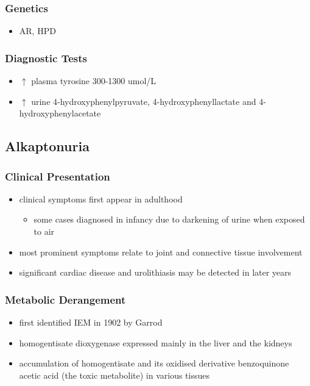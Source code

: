\documentclass{scrartcl}
\begin{document}
\subsubsection{Genetics}
\label{sec:org3e76289}
\begin{itemize}
\item AR, HPD
\end{itemize}
\subsubsection{Diagnostic Tests}
\label{sec:orgec4a53f}
\begin{itemize}
\item \(\uparrow\) plasma tyrosine 300-1300 umol/L
\item \(\uparrow\) urine 4-hydroxyphenylpyruvate, 4-hydroxyphenyllactate and 4-hydroxyphenylacetate
\end{itemize}

\subsection{Alkaptonuria}
\label{sec:org5587962}
\subsubsection{Clinical Presentation}
\label{sec:org7e76c55}
\begin{itemize}
\item clinical symptoms first appear in adulthood
\begin{itemize}
\item some cases diagnosed in infancy due to darkening of urine when
exposed to air
\end{itemize}
\item most prominent symptoms relate to joint and connective tissue involvement
\item significant cardiac disease and urolithiasis may be detected in later years
\end{itemize}
\subsubsection{Metabolic Derangement}
\label{sec:orgc9984c9}
\begin{itemize}
\item first identified IEM in 1902 by Garrod
\item homogentisate dioxygenase expressed mainly in the liver and the
kidneys
\end{itemize}
\begin{itemize}
\item accumulation of homogentisate and its oxidised derivative
benzoquinone acetic acid (the toxic metabolite) in various tissues
\end{itemize}
\end{document}
